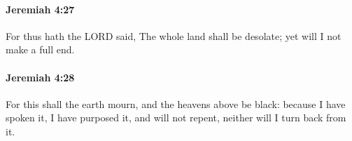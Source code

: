 		\paragraph{Jeremiah 4:27} %
			\label{JEREMIAH-4-27}

			For thus hath the LORD said, The whole land shall be desolate; yet will I not make a full end.


		\paragraph{Jeremiah 4:28} %
			\label{JEREMIAH-4-28}

			For this shall the earth mourn, and the heavens above be black: because I have spoken it, I have purposed it, and will not repent, neither will I turn back from it.


